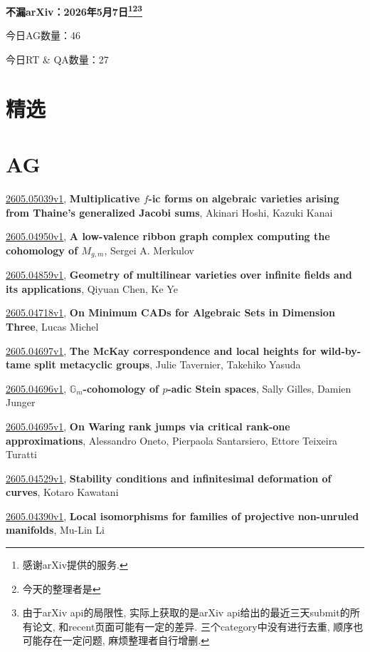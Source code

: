 \documentclass[9pt, a4paper]{article}
\theoremstyle{plain}
\theoremstyle{definition}
\theoremstyle{remark}
\newcommand{\arxiv}[3]{\href{https://arxiv.org/abs/#1}{#1}, \textbf{\textcolor{arxivblue}{#2}}, #3}
\newcommand{\AGnumber}{46}
\newcommand{\RTQAnumber}{27}
\newcommand{\NewestDate}{2026年5月7日}
\newcommand{\todayarXiver}{} %
\begin{document}
\begin{center}
    \Huge\textbf{不漏arXiv：\NewestDate\footnote{感谢arXiv提供的服务.}\footnote{今天的整理者是\todayarXiver}\footnote{由于arXiv api的局限性, 实际上获取的是arXiv api给出的最近三天submit的所有论文, 和recent页面可能有一定的差异. 三个category中没有进行去重, 顺序也可能存在一定问题, 麻烦整理者自行增删.}} \\
\end{center}

\setcounter{section}{-1}

\begin{center}
    今日AG数量：\AGnumber
    
    今日RT \& QA数量：\RTQAnumber
    
\end{center}


\section{精选}


\section{AG}
\arxiv{2605.05039v1}{Multiplicative $f$-ic forms on algebraic varieties arising from Thaine's generalized Jacobi sums}{Akinari Hoshi, Kazuki Kanai}

\arxiv{2605.04950v1}{A low-valence ribbon graph complex computing the cohomology of $M_{g,m}$}{Sergei A. Merkulov}

\arxiv{2605.04859v1}{Geometry of multilinear varieties over infinite fields and its applications}{Qiyuan Chen, Ke Ye}

\arxiv{2605.04718v1}{On Minimum CADs for Algebraic Sets in Dimension Three}{Lucas Michel}

\arxiv{2605.04697v1}{The McKay correspondence and local heights for wild-by-tame split metacyclic groups}{Julie Tavernier, Takehiko Yasuda}

\arxiv{2605.04696v1}{$\mathbb{G}_m$-cohomology of $p$-adic Stein spaces}{Sally Gilles, Damien Junger}

\arxiv{2605.04695v1}{On Waring rank jumps via critical rank-one approximations}{Alessandro Oneto, Pierpaola Santarsiero, Ettore Teixeira Turatti}

\arxiv{2605.04529v1}{Stability conditions and infinitesimal deformation of curves}{Kotaro Kawatani}

\arxiv{2605.04390v1}{Local isomorphisms for families of projective non-unruled manifolds}{Mu-Lin Li}
\end{document}
